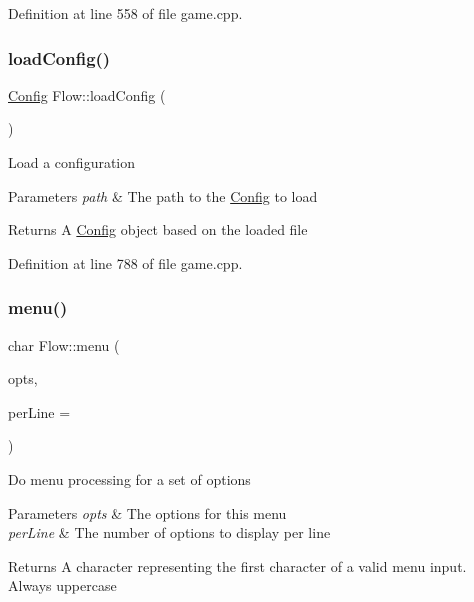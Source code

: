 Definition at line 558 of file game.\+cpp.

\hypertarget{namespace_flow_a6f9081155759b0d9a6545badc4603044}{}\label{namespace_flow_a6f9081155759b0d9a6545badc4603044} 
\subsubsection{\texorpdfstring{load\+Config()}{loadConfig()}}
{\footnotesize\ttfamily \hyperlink{struct_flow_1_1_config}{Config} Flow\+::load\+Config (\begin{DoxyParamCaption}\item[{const std\+::string \&}]{ }\end{DoxyParamCaption})}

Load a configuration 
\begin{DoxyParams}{Parameters}
{\em path} & The path to the \hyperlink{struct_flow_1_1_config}{Config} to load \\
\hline
\end{DoxyParams}
\begin{DoxyReturn}{Returns}
A \hyperlink{struct_flow_1_1_config}{Config} object based on the loaded file 
\end{DoxyReturn}


Definition at line 788 of file game.\+cpp.

\hypertarget{namespace_flow_a77375f0311e9ec10f181058d624dba17}{}\label{namespace_flow_a77375f0311e9ec10f181058d624dba17} 
\subsubsection{\texorpdfstring{menu()}{menu()}}
{\footnotesize\ttfamily char Flow\+::menu (\begin{DoxyParamCaption}\item[{const \hyperlink{class_collections_1_1_linked_list}{Collections\+::\+Linked\+List}$<$ std\+::string $>$ \&}]{opts,  }\item[{int}]{per\+Line = {} }\end{DoxyParamCaption})}

Do menu processing for a set of options 
\begin{DoxyParams}{Parameters}
{\em opts} & The options for this menu \\
\hline
{\em per\+Line} & The number of options to display per line \\
\hline
\end{DoxyParams}
\begin{DoxyReturn}{Returns}
A character representing the first character of a valid menu input. Always uppercase 
\end{DoxyReturn}


